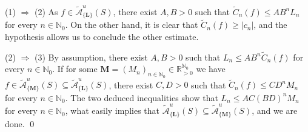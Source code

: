 \documentclass[11pt,a4paper]{article}
\theoremstyle{plain}
\newtheorem{theorem}[proposition]{Theorem}
\theoremstyle{definition}
\newcommand{\RR}{\mathbb{R}}
\newcommand{\NN}{\mathbb{N}}
\newcommand{\M}{\mathbf{M}}
\newcommand{\LL}{\mathbf{L}}
\begin{document}
(1) $\Rightarrow$ (2) As $f\in \widetilde{\mathcal{A}}^u_{\{\LL\}} (S)$, there exist $A,B>0$ such that $\widetilde{C}_n(f)\le AB^nL_n$ for every $n\in\NN_0$. On the other hand, it is clear that $\widetilde{C}_n(f)\geq |c_n|$, and the hypothesis allows us to conclude the other estimate.

(2)  $\Rightarrow$ (3) By assumption, there exist $A,B>0$ such that $L_n\le A{B}^n\widetilde{C}_n(f)$ for every $n\in\NN_0$. If for some $\M=(M_n)_{n\in\NN_0}\in\RR_{>0}^{\NN_0}$ we have $f\in \widetilde{\mathcal{A}}^u_{\{\M\}} (S)\subseteq \widetilde{\mathcal{A}}^u_{\{\LL\}} (S)$, there exist $C,D>0$ such that $\widetilde{C}_n(f)\le C {D}^nM_n$ for every $n\in\NN_0$. The two deduced inequalities show that $L_n\le{ AC(BD)^n}M_n$ for every $n\in\NN_0$, what easily implies that $\widetilde{\mathcal{A}}^u_{\{\LL\}} (S)\subseteq \widetilde{\mathcal{A}}^u_{\{\M\}} (S)$, and we are done.
\qed\enddemo

%
%
%
\end{document}
